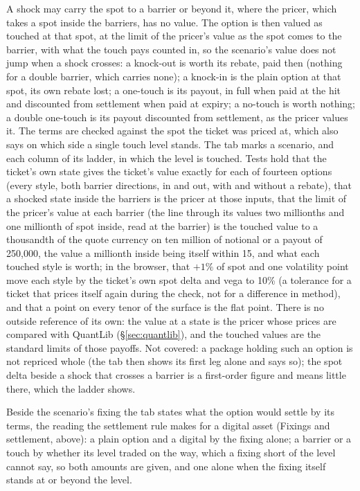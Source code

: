 \documentclass[11pt,a4paper]{article}
\begin{document}
A shock may carry the spot to a barrier or beyond it, where the pricer, which takes a spot inside the barriers, has no value. The option is then valued as touched at that spot, at the limit of the pricer's value as the spot comes to the barrier, with what the touch pays counted in, so the scenario's value does not jump when a shock crosses: a knock-out is worth its rebate, paid then (nothing for a double barrier, which carries none); a knock-in is the plain option at that spot, its own rebate lost; a one-touch is its payout, in full when paid at the hit and discounted from settlement when paid at expiry; a no-touch is worth nothing; a double one-touch is its payout discounted from settlement, as the pricer values it. The terms are checked against the spot the ticket was priced at, which also says on which side a single touch level stands. The tab marks a scenario, and each column of its ladder, in which the level is touched. Tests hold that the ticket's own state gives the ticket's value exactly for each of fourteen options (every style, both barrier directions, in and out, with and without a rebate), that a shocked state inside the barriers is the pricer at those inputs, that the limit of the pricer's value at each barrier (the line through its values two millionths and one millionth of spot inside, read at the barrier) is the touched value to a thousandth of the quote currency on ten million of notional or a payout of 250{,}000, the value a millionth inside being itself within 15, and what each touched style is worth; in the browser, that $+1\%$ of spot and one volatility point move each style by the ticket's own spot delta and vega to 10\% (a tolerance for a ticket that prices itself again during the check, not for a difference in method), and that a point on every tenor of the surface is the flat point. There is no outside reference of its own: the value at a state is the pricer whose prices are compared with QuantLib (\S\ref{sec:quantlib}), and the touched values are the standard limits of those payoffs. Not covered: a package holding such an option is not repriced whole (the tab then shows its first leg alone and says so); the spot delta beside a shock that crosses a barrier is a first-order figure and means little there, which the ladder shows.

Beside the scenario's fixing the tab states what the option would settle by its terms, the reading the settlement rule makes for a digital asset (Fixings and settlement, above): a plain option and a digital by the fixing alone; a barrier or a touch by whether its level traded on the way, which a fixing short of the level cannot say, so both amounts are given, and one alone when the fixing itself stands at or beyond the level.
\end{document}
